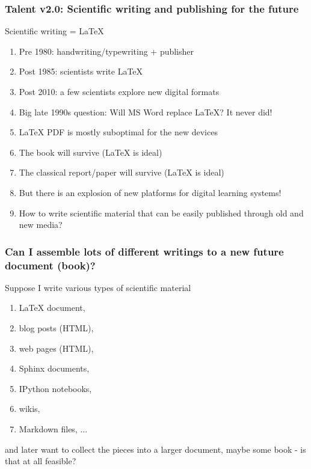 \documentclass{beamer}
\begin{document}
\begin{frame}
\frametitle{Talent v2.0: Scientific writing and publishing for the future}

\begin{block}{}
Scientific writing = {\LaTeX}

\begin{enumerate}
\item Pre 1980: handwriting/typewriting + publisher

\item Post 1985: scientists write {\LaTeX}

\item Post 2010: a few scientists explore new digital formats

\item Big late 1990s question: Will MS Word replace {\LaTeX}? It never did!

\item {\LaTeX} PDF is mostly suboptimal for the new devices

\item The book will survive ({\LaTeX} is ideal)

\item The classical report/paper will survive ({\LaTeX} is ideal)

\item But there is an explosion of new platforms for digital learning systems!

\item How to write scientific material that can be easily published through old and new media?
\end{enumerate}

\noindent
\end{block}
\end{frame}

\begin{frame}
\frametitle{Can I assemble lots of different writings to a new future document (book)?}

\begin{block}{}
Suppose I write various types of scientific material
\begin{enumerate}
\item {\LaTeX} document,

\item blog posts (HTML),

\item web pages (HTML),

\item Sphinx documents,

\item IPython notebooks,

\item wikis,

\item Markdown files, ...
\end{enumerate}

\noindent
and later want to collect the pieces into a larger document, maybe some book - is that at all feasible?

\end{block}
\end{frame}
\end{document}
